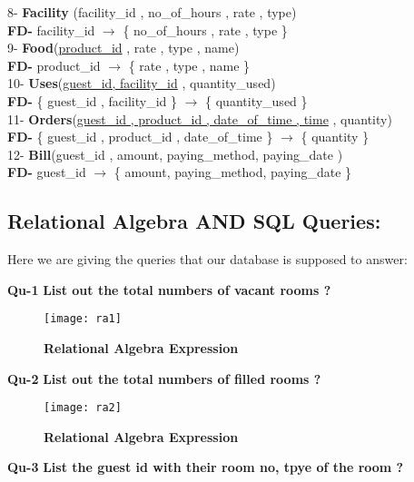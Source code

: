 \documentclass[a4,12pt]{report}
\begin{document}
8- \textbf{Facility} (facility\_id , no\_of\_hours , rate , type) \\
\textbf{FD-} facility\_id $ \rightarrow $ \{ no\_of\_hours , rate , type \}\\

9- \textbf{Food}(\uline{product\_id} , rate , type , name) \\
\textbf{FD- } product\_id $ \rightarrow $ \{ rate , type , name \} \\

10- \textbf{Uses}(\uline{guest\_id, facility\_id} , quantity\_used) \\
\textbf{FD-} \{ guest\_id , facility\_id \} $ \rightarrow $ \{ quantity\_used \} \\

11- \textbf{Orders}(\uline{guest\_id , product\_id , date\_of\_time , time} , quantity) \\
\textbf{FD-} \{ guest\_id , product\_id , date\_of\_time \} $ \rightarrow $ \{ quantity \}\\

12- \textbf{Bill}(guest\_id , amount, paying\_method, paying\_date ) \\
\textbf{FD-} guest\_id $ \rightarrow $ \{ amount, paying\_method, paying\_date \} \\

\newpage
\subsection*{Relational Algebra AND SQL Queries:}
Here we are giving the queries that our database is supposed to answer:

\textbf{Qu-1} \textbf{  List out the total numbers of vacant rooms ?}\\

\begin{figure}[hbtp]
\centering
\texttt{[image: ra1]}
\caption{\textbf{{\color{red}Relational Algebra Expression}}}
\end{figure}


\textbf{Qu-2} \textbf{ List out the total numbers of filled rooms ? }\\

\begin{figure}[hbtp]
\centering
\texttt{[image: ra2]}
\caption{\textbf{{\color{red}Relational Algebra Expression}}}
\end{figure}

\textbf{Qu-3} \textbf{ List the guest id with their room no, tpye of the room ? }\\
\end{document}
